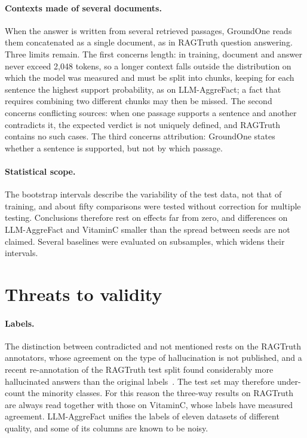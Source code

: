 \paragraph{Contexts made of several documents.} When the answer is written from several retrieved passages, GroundOne
reads them concatenated as a single document, as in RAGTruth question answering. Three limits remain. The first concerns
length: in training, document and answer never exceed 2{,}048 tokens, so a longer context falls outside the distribution
on which the model was measured and must be split into chunks, keeping for each sentence the highest support probability,
as on LLM-AggreFact; a fact that requires combining two different chunks may then be missed. The second concerns
conflicting sources: when one passage supports a sentence and another contradicts it, the expected verdict is not
uniquely defined, and RAGTruth contains no such cases. The third concerns attribution: GroundOne states whether a sentence
is supported, but not by which passage.

\paragraph{Statistical scope.} The bootstrap intervals describe the variability of the test data, not that of training,
and about fifty comparisons were tested without correction for multiple testing. Conclusions therefore rest on effects far
from zero, and differences on LLM-AggreFact and VitaminC smaller than the spread between seeds are not claimed. Several
baselines were evaluated on subsamples, which widens their intervals.

\section{Threats to validity}
\label{sec:disc-threats}

\paragraph{Labels.} The distinction between contradicted and not mentioned rests on the RAGTruth annotators, whose
agreement on the type of hallucination is not published, and a recent re-annotation of the RAGTruth test split found
considerably more hallucinated answers than the original labels~\cite{yu2026retromorphic}. The test set may therefore
under-count the minority classes. For this reason the three-way results on RAGTruth are always read together with those
on VitaminC, whose labels have measured agreement. LLM-AggreFact unifies the labels of eleven datasets of different
quality, and some of its columns are known to be noisy.

